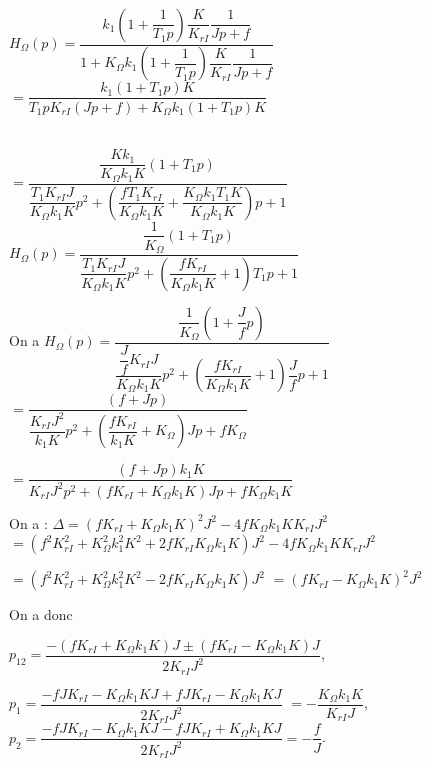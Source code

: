 \begin{corrigebox}[Corrigé]
~\\

$H_{\Omega}(p)=\dfrac{k_{1}\left( 1 + \dfrac{1}{T_{1}p} \right)\dfrac{K}{K_{rI}}\dfrac{1}{Jp+f}}{1+ K_{\Omega}k_{1}\left( 1 +\dfrac{1}{T_{1}p} \right)\dfrac{K}{K_{rI}}\dfrac{1}{Jp+f}}$
$=\dfrac{k_{1}\left( 1 + T_{1}p \right)K}{T_{1}p K_{rI}\left(Jp+f\right) + K_{\Omega}k_{1}\left(1+ T_{1}p\right) K}$

~\\

$=\dfrac{\dfrac{Kk_{1}}{K_{\Omega}k_{1}K}\left( 1 + T_{1}p \right)}{\dfrac{T_{1} K_{rI}J}{K_{\Omega}k_{1}K}p^2+\left(\dfrac{fT_{1} K_{rI}}{K_{\Omega}k_{1}K}+\dfrac{K_{\Omega}k_{1}T_{1}K}{K_{\Omega}k_{1}K}\right)p + 1 }$
$H_{\Omega}(p)=\dfrac{\dfrac{1}{K_{\Omega}}\left( 1 + T_{1}p \right)}{\dfrac{T_{1} K_{rI}J}{K_{\Omega}k_{1}K}p^2+\left(\dfrac{f K_{rI}}{K_{\Omega}k_{1}K}+1\right)T_{1}p + 1 }$
~\\

\footnotesize

On a 
$H_{\Omega}(p)=\dfrac{\dfrac{1}{K_{\Omega}}\left( 1 + \dfrac{J}{f}p \right)}{\dfrac{\dfrac{J}{f} K_{rI}J}{K_{\Omega}k_{1}K}p^2+\left(\dfrac{f K_{rI}}{K_{\Omega}k_{1}K}+1\right)\dfrac{J}{f}p + 1 }$
$=\dfrac{\left( f + Jp \right)}{\dfrac{ K_{rI}J^2}{k_{1}K}p^2+\left(\dfrac{f K_{rI}}{k_{1}K}+K_{\Omega}\right)Jp + fK_{\Omega}}$

$=\dfrac{\left( f + Jp \right)k_{1}K}{ K_{rI}J^2p^2+\left(f K_{rI}+K_{\Omega}k_{1}K\right)Jp + fK_{\Omega}k_{1}K}$

On a :
$\Delta =\left(f K_{rI}+K_{\Omega}k_{1}K\right)^2J^2 -4 fK_{\Omega}k_{1}KK_{rI}J^2 $ 
$=\left(f^2 K_{rI}^2+K_{\Omega}^2k_{1}^2K^2+2f K_{rI}K_{\Omega}k_{1}K\right)J^2 -4 fK_{\Omega}k_{1}KK_{rI}J^2 $

$=\left(f^2 K_{rI}^2+K_{\Omega}^2k_{1}^2K^2-2f K_{rI}K_{\Omega}k_{1}K\right)J^2  $
$=\left(f K_{rI}-K_{\Omega}k_{1}K\right)^2J^2  $

On a donc 

$p_{12} = \dfrac{-\left(f K_{rI}+K_{\Omega}k_{1}K\right)J \pm \left(f K_{rI}-K_{\Omega}k_{1}K\right)J}{2 K_{rI}J^2}$, 

$p_{1} = \dfrac{-fJ K_{rI}-K_{\Omega}k_{1}KJ + fJ K_{rI}-K_{\Omega}k_{1}KJ}{2 K_{rI}J^2}$
$= -\dfrac{K_{\Omega}k_{1}K }{ K_{rI}J}$, 
$p_{2} = \dfrac{-fJ K_{rI}-K_{\Omega}k_{1}KJ -fJ K_{rI}+K_{\Omega}k_{1}KJ}{2 K_{rI}J^2}= -\dfrac{f }{J}$.


\end{corrigebox}

